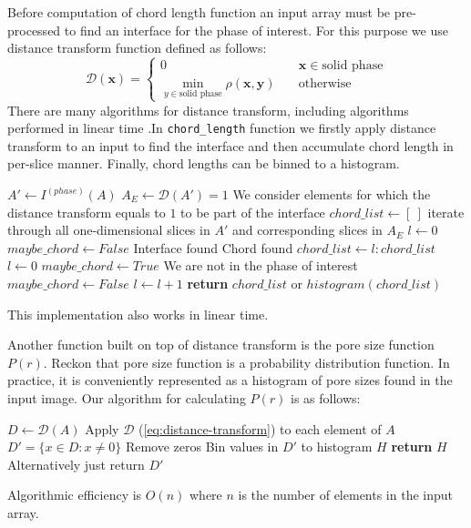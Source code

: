 \documentclass[1p]{elsarticle}
\newcommand{\code}[1]{\colorbox{light-gray}{\texttt{#1}}}
\begin{document}
Before computation of chord length function an input array must be pre-processed
to find an interface for the phase of interest. For this purpose we use
distance transform function defined as follows:
\begin{equation}
  \mathcal{D}(\bm{x})= \left\{
  \begin{array}{ll}
    0 & \quad \bm{x} \in \text{solid phase} \\
    \min\limits_{y \in \text{solid phase}} \rho(\bm{x},\bm{y}) & \quad \text{otherwise}
  \end{array}
\right. \label{eq:distance-transform}
\end{equation}
There are many algorithms for distance transform, including algorithms performed
in linear time \cite{DT}.In \code{chord\_length} function we firstly apply
distance transform to an input to find the interface and then accumulate chord
length in per-slice manner. Finally, chord lengths can be binned to a histogram.
\begin{algorithmic}[1]
    \State $A' \gets I^{(phase)}(A)$
    \State $A_E \gets \mathcal{D}(A') = 1$
    \Comment We consider elements for which the distance transform equals to $1$
    to be part of the interface
    \State $chord\_list \gets [\ ]$
      \Comment iterate through all one-dimensional slices in $A'$ and
      corresponding slices in $A_E$
      \State $l \gets 0$
      \State $maybe\_chord \gets False$
          \Comment Interface found
            \Comment Chord found
            \State $chord\_list \gets l:chord\_list$
          \EndIf
          \State $l \gets 0$
          \State $maybe\_chord \gets True$
          \Comment We are not in the phase of interest
          \State $maybe\_chord \gets False$
        \EndIf
        \State $l \gets l+1$
      \EndFor
    \EndFor
    \State \textbf{return} $chord\_list$ or $histogram(chord\_list)$
  \EndProcedure
\end{algorithmic}
This implementation also works in linear time.

Another function built on top of distance transform is the pore size function
$P(r)$. Reckon that pore size function is a probability distribution
function. In practice, it is conveniently represented as a histogram of pore sizes
found in the input image. Our algorithm for calculating $P(r)$ is as follows:
\begin{algorithmic}[1]
    \State $D \gets \mathcal{D}(A)$
    \Comment Apply $\mathcal{D}$ (\cref{eq:distance-transform}) to each element of $A$
    \State $D' = \{ x \in D: x \ne 0\}$
    \Comment Remove zeros
    \State Bin values in $D'$ to histogram $H$
    \State \textbf{return} $H$
    \Comment Alternatively just return $D'$
  \EndProcedure
\end{algorithmic}
Algorithmic efficiency is $O(n)$ where $n$ is the number of elements in the
input array.
\end{document}
